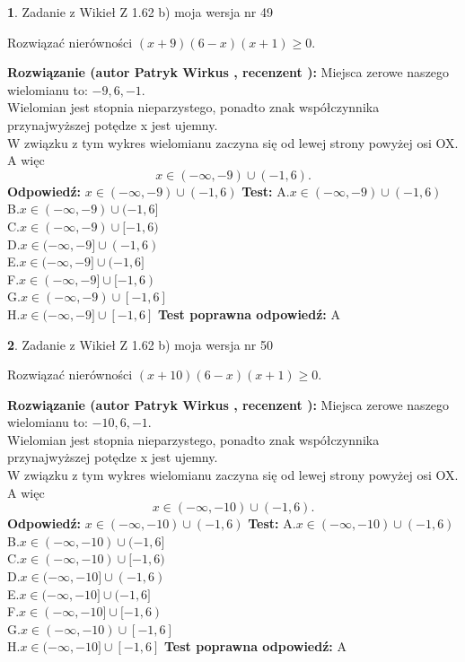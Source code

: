\documentclass[12pt, a4paper]{article}
\theoremstyle{definition} %
\newtheorem{zad}{}
\newcommand{\zadStart}[1]{\begin{zad}#1\newline}
\newcommand{\zadStop}{\end{zad}}
\newcommand{\rozwStart}[2]{\noindent \textbf{Rozwiązanie (autor #1 , recenzent #2): }\newline}
\newcommand{\rozwStop}{\newline}
\newcommand{\odpStart}{\noindent \textbf{Odpowiedź:}\newline}
\newcommand{\odpStop}{\newline}
\newcommand{\testStart}{\noindent \textbf{Test:}\newline}
\newcommand{\testStop}{\newline}
\newcommand{\kluczStart}{\noindent \textbf{Test poprawna odpowiedź:}\newline}
\newcommand{\kluczStop}{\newline}
\begin{document}
\zadStart{Zadanie z Wikieł Z 1.62 b) moja wersja nr 49}

Rozwiązać nierówności $(x+9)(6-x)(x+1)\ge0$.
\zadStop
\rozwStart{Patryk Wirkus}{}
Miejsca zerowe naszego wielomianu to: $-9, 6, -1$.\\
Wielomian jest stopnia nieparzystego, ponadto znak współczynnika przy\linebreak najwyższej potędze x jest ujemny.\\ W związku z tym wykres wielomianu zaczyna się od lewej strony powyżej osi OX. A więc $$x \in (-\infty,-9) \cup (-1,6).$$
\rozwStop
\odpStart
$x \in (-\infty,-9) \cup (-1,6)$
\odpStop
\testStart
A.$x \in (-\infty,-9) \cup (-1,6)$\\
B.$x \in (-\infty,-9) \cup (-1,6]$\\
C.$x \in (-\infty,-9) \cup [-1,6)$\\
D.$x \in (-\infty,-9] \cup (-1,6)$\\
E.$x \in (-\infty,-9] \cup (-1,6]$\\
F.$x \in (-\infty,-9] \cup [-1,6)$\\
G.$x \in (-\infty,-9) \cup [-1,6]$\\
H.$x \in (-\infty,-9] \cup [-1,6]$
\testStop
\kluczStart
A
\kluczStop



\zadStart{Zadanie z Wikieł Z 1.62 b) moja wersja nr 50}

Rozwiązać nierówności $(x+10)(6-x)(x+1)\ge0$.
\zadStop
\rozwStart{Patryk Wirkus}{}
Miejsca zerowe naszego wielomianu to: $-10, 6, -1$.\\
Wielomian jest stopnia nieparzystego, ponadto znak współczynnika przy\linebreak najwyższej potędze x jest ujemny.\\ W związku z tym wykres wielomianu zaczyna się od lewej strony powyżej osi OX. A więc $$x \in (-\infty,-10) \cup (-1,6).$$
\rozwStop
\odpStart
$x \in (-\infty,-10) \cup (-1,6)$
\odpStop
\testStart
A.$x \in (-\infty,-10) \cup (-1,6)$\\
B.$x \in (-\infty,-10) \cup (-1,6]$\\
C.$x \in (-\infty,-10) \cup [-1,6)$\\
D.$x \in (-\infty,-10] \cup (-1,6)$\\
E.$x \in (-\infty,-10] \cup (-1,6]$\\
F.$x \in (-\infty,-10] \cup [-1,6)$\\
G.$x \in (-\infty,-10) \cup [-1,6]$\\
H.$x \in (-\infty,-10] \cup [-1,6]$
\testStop
\kluczStart
A
\kluczStop
\end{document}
